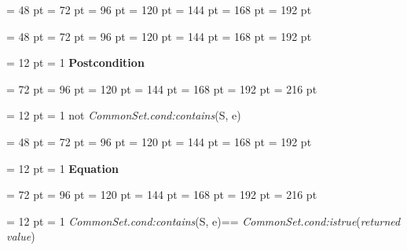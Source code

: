 {{{{\par \noindent  \leftskip = 48 pt  \leftmargini = 72 pt  \leftmarginii = 96 pt  \leftmarginiii = 120 pt  \leftmarginiv = 144 pt  \leftmarginv = 168 pt  \leftmarginvi = 192 pt {\par \noindent
\par}
\par}
{\par \noindent  \leftskip = 48 pt  \leftmargini = 72 pt  \leftmarginii = 96 pt  \leftmarginiii = 120 pt  \leftmarginiv = 144 pt  \leftmarginv = 168 pt  \leftmarginvi = 192 pt {\par \noindent
{\par \pagebreak[3.100000] \noindent \hangindent = 12 pt \hangafter = 1 
{\bf Postcondition\/}\par}
{\par \noindent  \leftskip = 72 pt  \leftmargini = 96 pt  \leftmarginii = 120 pt  \leftmarginiii = 144 pt  \leftmarginiv = 168 pt  \leftmarginv = 192 pt  \leftmarginvi = 216 pt {\par \noindent
{\par \pagebreak[3.000000] \noindent \hangindent = 12 pt \hangafter = 1 
not  {\em CommonSet.cond:contains\/}(S, e)\par}
\par}
\par}
\par}
\par}
{\par \noindent  \leftskip = 48 pt  \leftmargini = 72 pt  \leftmarginii = 96 pt  \leftmarginiii = 120 pt  \leftmarginiv = 144 pt  \leftmarginv = 168 pt  \leftmarginvi = 192 pt {\par \noindent
{\par \pagebreak[3.100000] \noindent \hangindent = 12 pt \hangafter = 1 
{\bf Equation\/}\par}
{\par \noindent  \leftskip = 72 pt  \leftmargini = 96 pt  \leftmarginii = 120 pt  \leftmarginiii = 144 pt  \leftmarginiv = 168 pt  \leftmarginv = 192 pt  \leftmarginvi = 216 pt {\par \noindent
{\par \pagebreak[3.000000] \noindent \hangindent = 12 pt \hangafter = 1 
{\bf {}\/} {\em CommonSet.cond:contains\/}(S, e){\large  == }{\bf {}\/} {\em CommonSet.cond:istrue\/}({\em returned value\/})\par}
\par}
\par}
\par}
\par}
\par}
\par}
\par}
